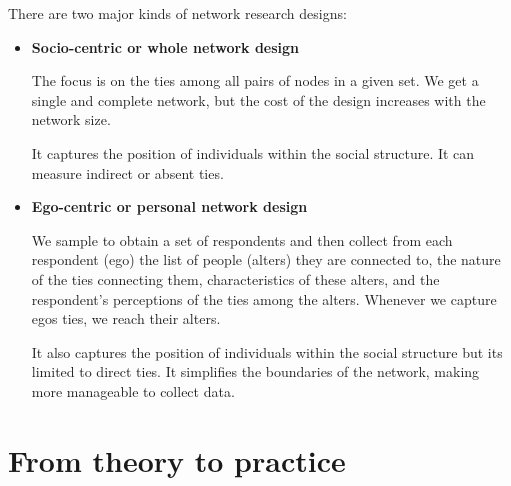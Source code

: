 \documentclass[
  notitlepage,
  onecolumn,
  openany]{book}
\begin{document}
There are two major kinds of network research designs:

\begin{itemize}
\item
  \textbf{Socio-centric or whole network design}

  The focus is on the ties among all pairs of nodes in a given set. We get a single and complete network, but the cost of the design increases with the network size.

  It captures the position of individuals within the social structure. It can measure indirect or absent ties.
\item
  \textbf{Ego-centric or personal network design}

  We sample to obtain a set of respondents and then collect from each respondent (ego) the list of people (alters) they are connected to, the nature of the ties connecting them, characteristics of these alters, and the respondent's perceptions of the ties among the alters. Whenever we capture egos ties, we reach their alters.

  It also captures the position of individuals within the social structure but its limited to direct ties. It simplifies the boundaries of the network, making more manageable to collect data.
\end{itemize}

\hypertarget{from-theory-to-practice}{%
\section{From theory to practice}\label{from-theory-to-practice}}
\end{document}
